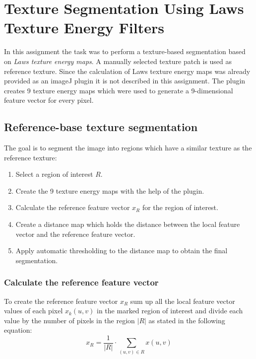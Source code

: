 \chapter{Texture Segmentation Using Laws Texture Energy Filters}

In this assignment the task was to perform a texture-based segmentation based on \textit{Laws texture energy maps}\cite{Laws1980}. A manually selected texture patch is used as reference texture. Since the calculation of Laws texture energy maps was already provided as an imageJ plugin it is not described in this assignment. The plugin creates 9 texture energy maps which were used to generate a 9-dimensional feature vector for every pixel. 

\section{Reference-base texture segmentation}

The goal is to segment the image into regions which have a similar texture as the reference texture:

\begin{enumerate}
	\item Select a region of interest $R$.
	\item Create the 9 texture energy maps with the help of the plugin.
	\item Calculate the reference feature vector $x_R$ for the region of interest.
	\item Create a distance map which holds the distance between the local feature vector and the reference feature vector.
	\item Apply automatic thresholding to the distance map to obtain the final segmentation.
\end{enumerate}

\subsection{Calculate the reference feature vector}
To create the reference feature vector $x_R$ sum up all the local feature vector values of each pixel $x_k(u,v)$ in the marked region of interest and divide each value by the number of pixels in the region $|R|$ as stated in the following equation:
\begin{equation}
	x_R = \frac{1}{|R|} \cdot \sum_{(u,v)\in R} x(u, v)
\end{equation}


